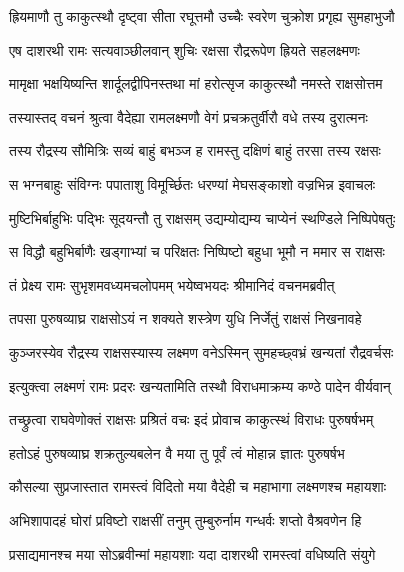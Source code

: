 
\twolineshloka
{ह्रियमाणौ तु काकुत्स्थौ दृष्ट्वा सीता रघूत्तमौ}
{उच्चैः स्वरेण चुक्रोश प्रगृह्य सुमहाभुजौ} %

\twolineshloka
{एष दाशरथी रामः सत्यवाञ्छीलवान् शुचिः}
{रक्षसा रौद्ररूपेण ह्रियते सहलक्ष्मणः} %

\twolineshloka
{मामृक्षा भक्षयिष्यन्ति शार्दूलद्वीपिनस्तथा}
{मां हरोत्सृज काकुत्स्थौ नमस्ते राक्षसोत्तम} %

\twolineshloka
{तस्यास्तद् वचनं श्रुत्वा वैदेह्या रामलक्ष्मणौ}
{वेगं प्रचक्रतुर्वीरौ वधे तस्य दुरात्मनः} %

\twolineshloka
{तस्य रौद्रस्य सौमित्रिः सव्यं बाहुं बभञ्ज ह}
{रामस्तु दक्षिणं बाहुं तरसा तस्य रक्षसः} %

\twolineshloka
{स भग्नबाहुः संविग्नः पपाताशु विमूर्च्छितः}
{धरण्यां मेघसङ्काशो वज्रभिन्न इवाचलः} %

\twolineshloka
{मुष्टिभिर्बाहुभिः पद्भिः सूदयन्तौ तु राक्षसम्}
{उद्यम्योद्यम्य चाप्येनं स्थण्डिले निष्पिपेषतुः} %

\twolineshloka
{स विद्धौ बहुभिर्बाणैः खड्गाभ्यां च परिक्षतः}
{निष्पिष्टो बहुधा भूमौ न ममार स राक्षसः} %

\twolineshloka
{तं प्रेक्ष्य रामः सुभृशमवध्यमचलोपमम्}
{भयेष्वभयदः श्रीमानिदं वचनमब्रवीत्} %

\twolineshloka
{तपसा पुरुषव्याघ्र राक्षसोऽयं न शक्यते}
{शस्त्रेण युधि निर्जेतुं राक्षसं निखनावहे} %

\twolineshloka
{कुञ्जरस्येव रौद्रस्य राक्षसस्यास्य लक्ष्मण}
{वनेऽस्मिन् सुमहच्छ्वभ्रं खन्यतां रौद्रवर्चसः} %

\twolineshloka
{इत्युक्त्वा लक्ष्मणं रामः प्रदरः खन्यतामिति}
{तस्थौ विराधमाक्रम्य कण्ठे पादेन वीर्यवान्} %

\twolineshloka
{तच्छ्रुत्वा राघवेणोक्तं राक्षसः प्रश्रितं वचः}
{इदं प्रोवाच काकुत्स्थं विराधः पुरुषर्षभम्} %

\twolineshloka
{हतोऽहं पुरुषव्याघ्र शक्रतुल्यबलेन वै}
{मया तु पूर्वं त्वं मोहान्न ज्ञातः पुरुषर्षभ} %

\twolineshloka
{कौसल्या सुप्रजास्तात रामस्त्वं विदितो मया}
{वैदेही च महाभागा लक्ष्मणश्च महायशाः} %

\twolineshloka
{अभिशापादहं घोरां प्रविष्टो राक्षसीं तनुम्}
{तुम्बुरुर्नाम गन्धर्वः शप्तो वैश्रवणेन हि} %

\twolineshloka
{प्रसाद्यमानश्च मया सोऽब्रवीन्मां महायशाः}
{यदा दाशरथी रामस्त्वां वधिष्यति संयुगे} %

